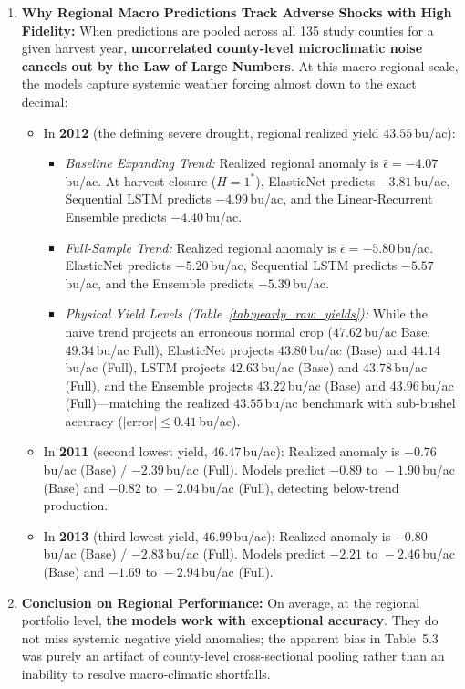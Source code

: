\documentclass[11pt,a4paper]{article}
\begin{document}
\begin{enumerate}
    \item \textbf{Why Regional Macro Predictions Track Adverse Shocks with High Fidelity:}
    When predictions are pooled across all 135 study counties for a given harvest year, \textbf{uncorrelated county-level microclimatic noise cancels out by the Law of Large Numbers}. At this macro-regional scale, the models capture systemic weather forcing almost down to the exact decimal:
    \begin{itemize}
        \item In \textbf{2012} (the defining severe drought, regional realized yield $43.55$\,bu/ac):
        \begin{itemize}
            \item \textit{Baseline Expanding Trend:} Realized regional anomaly is $\bar{\epsilon} = -4.07$\,bu/ac. At harvest closure ($H=1^*$), ElasticNet predicts $-3.81$\,bu/ac, Sequential LSTM predicts $-4.99$\,bu/ac, and the Linear-Recurrent Ensemble predicts $-4.40$\,bu/ac.
            \item \textit{Full-Sample Trend:} Realized regional anomaly is $\bar{\epsilon} = -5.80$\,bu/ac. ElasticNet predicts $-5.20$\,bu/ac, Sequential LSTM predicts $-5.57$\,bu/ac, and the Ensemble predicts $-5.39$\,bu/ac.
            \item \textit{Physical Yield Levels (Table~\ref{tab:yearly_raw_yields}):} While the naive trend projects an erroneous normal crop ($47.62$\,bu/ac Base, $49.34$\,bu/ac Full), ElasticNet projects $43.80$\,bu/ac (Base) and $44.14$\,bu/ac (Full), LSTM projects $42.63$\,bu/ac (Base) and $43.78$\,bu/ac (Full), and the Ensemble projects $43.22$\,bu/ac (Base) and $43.96$\,bu/ac (Full)---matching the realized $43.55$\,bu/ac benchmark with sub-bushel accuracy ($|\text{error}| \le 0.41$\,bu/ac).
        \end{itemize}
        \item In \textbf{2011} (second lowest yield, $46.47$\,bu/ac): Realized anomaly is $-0.76$\,bu/ac (Base) / $-2.39$\,bu/ac (Full). Models predict $-0.89\text{ to }-1.90$\,bu/ac (Base) and $-0.82\text{ to }-2.04$\,bu/ac (Full), detecting below-trend production.
        \item In \textbf{2013} (third lowest yield, $46.99$\,bu/ac): Realized anomaly is $-0.80$\,bu/ac (Base) / $-2.83$\,bu/ac (Full). Models predict $-2.21\text{ to }-2.46$\,bu/ac (Base) and $-1.69\text{ to }-2.94$\,bu/ac (Full).
    \end{itemize}
    \item \textbf{Conclusion on Regional Performance:} On average, at the regional portfolio level, \textbf{the models work with exceptional accuracy}. They do not miss systemic negative yield anomalies; the apparent bias in Table~5.3 was purely an artifact of county-level cross-sectional pooling rather than an inability to resolve macro-climatic shortfalls.
\end{enumerate}
\end{document}
